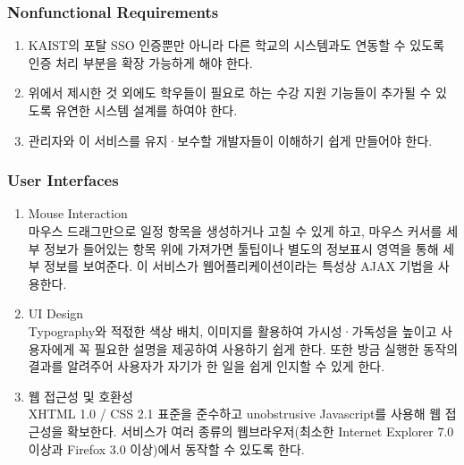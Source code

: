 \documentclass[a4paper,titlepage]{article}
\begin{document}
\subsubsection{Nonfunctional Requirements}
\begin{enumerate}
	\item KAIST의 포탈 SSO 인증뿐만 아니라 다른 학교의 시스템과도 연동할 수 있도록 인증 처리 부분을 확장 가능하게 해야 한다.
	\item 위에서 제시한 것 외에도 학우들이 필요로 하는 수강 지원 기능들이 추가될 수 있도록 유연한 시스템 설계를 하여야 한다.
	\item 관리자와 이 서비스를 유지·보수할 개발자들이 이해하기 쉽게 만들어야 한다.
\end{enumerate}
\subsubsection{User Interfaces}
\begin{enumerate}
	\item Mouse Interaction\\
	마우스 드래그만으로 일정 항목을 생성하거나 고칠 수 있게 하고, 마우스 커서를 세부 정보가 들어있는 항목 위에 가져가면 툴팁이나 별도의 정보표시 영역을 통해 세부 정보를 보여준다.
	이 서비스가 웹어플리케이션이라는 특성상 AJAX 기법을 사용한다. 
	\item UI Design\\
	Typography와 적젃한 색상 배치, 이미지를 활용하여 가시성·가독성을 높이고 사용자에게 꼭 필요한 설명을 제공하여 사용하기 쉽게 한다.
	또한 방금 실행한 동작의 결과를 알려주어 사용자가 자기가 한 일을 쉽게 인지할 수 있게 한다.
	\item 웹 접근성 및 호환성\\
	XHTML 1.0 / CSS 2.1 표준을 준수하고 unobstrusive Javascript를 사용해 웹 접근성을 확보한다.
	서비스가 여러 종류의 웹브라우저(최소한 Internet Explorer 7.0 이상과 Firefox 3.0 이상)에서 동작할 수 있도록 한다. 
\end{enumerate}
\end{document}
